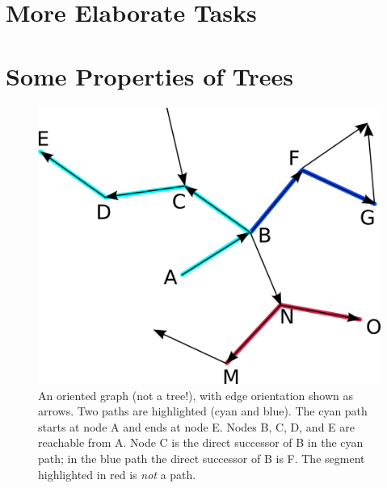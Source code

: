 \documentclass[a4paper,10pt]{report}
\theoremstyle{definition}
\begin{document}
\chapter{More Elaborate Tasks}
\label{chap_adv}

\appendix

\chapter{Some Properties of Trees}
\label{sct_defining_clades}

\begin{figure}[t]
\centering
\includegraphics{oriented_graph.png}
 \caption{An oriented graph (not a tree!), with edge orientation shown as arrows. Two paths are highlighted (cyan and blue). The cyan path starts at node A and ends at node E. Nodes B, C, D, and E are reachable from A. Node C is the direct successor of B in the cyan path; in the blue path the direct successor of B is F. The segment highlighted in red is \emph{not} a path.}
 \label{fig_oriented_graph}
\end{figure}
\end{document}
